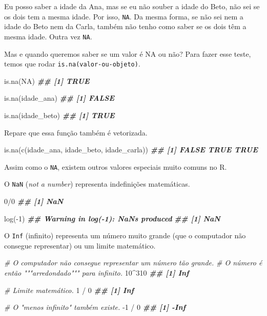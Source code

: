\documentclass[
]{book}
\newenvironment{Shaded}{\begin{snugshade}}{\end{snugshade}}
\newcommand{\CommentTok}[1]{\textcolor[rgb]{0.56,0.35,0.01}{\textit{#1}}}
\newcommand{\ConstantTok}[1]{\textcolor[rgb]{0.00,0.00,0.00}{#1}}
\newcommand{\DecValTok}[1]{\textcolor[rgb]{0.00,0.00,0.81}{#1}}
\newcommand{\DocumentationTok}[1]{\textcolor[rgb]{0.56,0.35,0.01}{\textbf{\textit{#1}}}}
\newcommand{\FunctionTok}[1]{\textcolor[rgb]{0.00,0.00,0.00}{#1}}
\newcommand{\NormalTok}[1]{#1}
\newcommand{\SpecialCharTok}[1]{\textcolor[rgb]{0.00,0.00,0.00}{#1}}
\begin{document}
Eu posso saber a idade da Ana, mas se eu não souber a idade do Beto, não sei se os dois tem a mesma idade. Por isso, \texttt{NA}. Da mesma forma, se não sei nem a idade do Beto nem da Carla, também não tenho como saber se os dois têm a mesma idade. Outra vez \texttt{NA}.

Mas e quando queremos saber se um valor é NA ou não? Para fazer esse teste, temos que rodar \texttt{is.na(valor-ou-objeto)}.

\begin{Shaded}
\begin{Highlighting}[]
\FunctionTok{is.na}\NormalTok{(}\ConstantTok{NA}\NormalTok{)}
\DocumentationTok{\#\# [1] TRUE}

\FunctionTok{is.na}\NormalTok{(idade\_ana)}
\DocumentationTok{\#\# [1] FALSE}

\FunctionTok{is.na}\NormalTok{(idade\_beto)}
\DocumentationTok{\#\# [1] TRUE}
\end{Highlighting}
\end{Shaded}

Repare que essa função também é vetorizada.

\begin{Shaded}
\begin{Highlighting}[]
\FunctionTok{is.na}\NormalTok{(}\FunctionTok{c}\NormalTok{(idade\_ana, idade\_beto, idade\_carla))}
\DocumentationTok{\#\# [1] FALSE  TRUE  TRUE}
\end{Highlighting}
\end{Shaded}

Assim como o \texttt{NA}, existem outros valores especiais muito comuns no R.

O \texttt{NaN} (\emph{not a number}) representa indefinições matemáticas.

\begin{Shaded}
\begin{Highlighting}[]
\DecValTok{0}\SpecialCharTok{/}\DecValTok{0}
\DocumentationTok{\#\# [1] NaN}

\FunctionTok{log}\NormalTok{(}\SpecialCharTok{{-}}\DecValTok{1}\NormalTok{)}
\DocumentationTok{\#\# Warning in log({-}1): NaNs produced}
\DocumentationTok{\#\# [1] NaN}
\end{Highlighting}
\end{Shaded}

O \texttt{Inf} (infinito) representa um número muito grande (que o computador não consegue representar) ou um limite matemático.

\begin{Shaded}
\begin{Highlighting}[]
\CommentTok{\# O computador não consegue representar um número tão grande.}
\CommentTok{\# O número é então """arredondado""" para infinito.}
\DecValTok{10}\SpecialCharTok{\^{}}\DecValTok{310}
\DocumentationTok{\#\# [1] Inf}

\CommentTok{\# Limite matemático.}
\DecValTok{1} \SpecialCharTok{/} \DecValTok{0}
\DocumentationTok{\#\# [1] Inf}

\CommentTok{\# O "menos infinito" também existe.}
\SpecialCharTok{{-}}\DecValTok{1} \SpecialCharTok{/} \DecValTok{0}
\DocumentationTok{\#\# [1] {-}Inf}
\end{Highlighting}
\end{Shaded}
\end{document}
